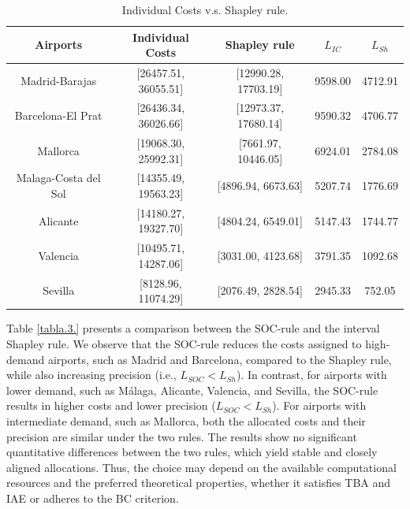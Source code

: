 \documentclass[12pt]{article}
\begin{document}
\begin{table}[h]

    \centering
    \begin{tabular}{c|c|c|c|c|}
        \textbf{Airports} &\textbf{Individual Costs} &\textbf{Shapley rule}  & \textbf{$L_{IC}$} & \textbf{$L_{Sh}$} \\ \hline
         Madrid-Barajas &  [26457.51, 36055.51] & [12990.28, 17703.19] & 9598.00& 4712.91\\
         Barcelona-El Prat &  [26436.34, 36026.66]  & [12973.37, 17680.14]  & 9590.32 &  4706.77\\
          Mallorca &  [19068.30, 25992.31]  & [7661.97, 10446.05] & 6924.01 & 2784.08  \\
          Malaga-Costa del Sol &  [14355.49, 19563.23]  & [4896.94, 6673.63] & 5207.74& 1776.69 \\
             Alicante &  [14180.27, 19327.70] & [4804.24, 6549.01] & 5147.43 & 1744.77 \\
          Valencia &  [10495.71, 14287.06] & [3031.00, 4123.68]  & 3791.35 & 1092.68 \\
        Sevilla &  [8128.96, 11074.29]  & [2076.49, 2828.54] & 2945.33 &  752.05  \\
    \end{tabular}
    \caption{Individual Costs v.s. Shapley rule.}
    \label{tabla.2.}
\end{table}

Table \ref{tabla.3.} presents a comparison between the SOC-rule and the interval Shapley rule. We observe that the SOC-rule reduces the costs assigned to high-demand airports, such as Madrid and Barcelona, compared to the Shapley rule, while also increasing precision (i.e., $L_{SOC}<L_{Sh}$). In contrast, for airports with lower demand, such as Málaga, Alicante, Valencia, and Sevilla, the SOC-rule results in higher costs and lower precision ($L_{SOC}<L_{Sh}$). For airports with intermediate demand, such as Mallorca, both the allocated costs and their precision are similar under the two rules. The results show no significant quantitative differences between the two rules, which yield stable and closely aligned allocations. Thus, the choice may depend on the available computational resources and the preferred theoretical properties, whether it satisfies TBA and IAE or adheres to the BC criterion.
\end{document}
